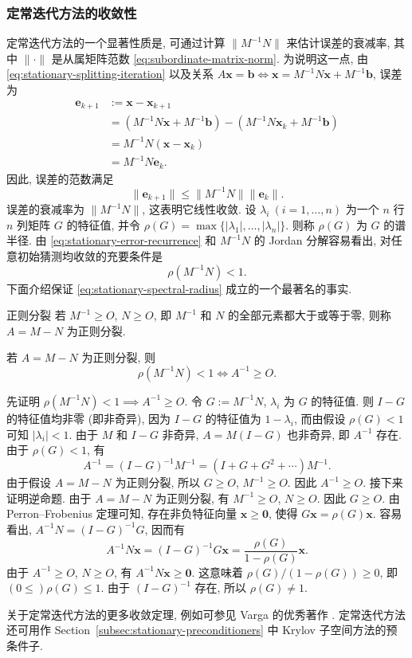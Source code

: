 \subsubsection{{定常迭代方法的收敛性}}\label{subsec:stationary-convergence}
{定常迭代方法的一个显著性质是, 可通过计算 $\|M^{-1}N\|$ 来估计误差的衰减率, 其中 $\|\cdot\|$ 是从属矩阵范数 \eqref{eq:subordinate-matrix-norm}. 为说明这一点, 由 \eqref{eq:stationary-splitting-iteration} 以及关系 $A\bm x=\bm b\iff\bm x=M^{-1}N\bm x+M^{-1}\bm b$, 误差为}
\begin{equation}\label{eq:stationary-error-recurrence}
\begin{aligned}
\bm e_{k+1}&:=\bm x-\bm x_{k+1}\\
&=(M^{-1}N\bm x+M^{-1}\bm b)-(M^{-1}N\bm x_k+M^{-1}\bm b)\\
&=M^{-1}N(\bm x-\bm x_k)\\
&=M^{-1}N\bm e_k.
\end{aligned}
\end{equation}
{因此, 误差的范数满足}
\[\|\bm e_{k+1}\|\le\|M^{-1}N\|\|\bm e_k\|.\]
{误差的衰减率为 $\|M^{-1}N\|$, 这表明它线性收敛.}
{设 $\lambda_i\ (i=1,\ldots,n)$ 为一个 $n$ 行 $n$ 列矩阵 $G$ 的特征值, 并令 $\rho(G)=\max\{|\lambda_1|,\ldots,|\lambda_n|\}$. 则称 $\rho(G)$ 为 $G$ 的谱半径. 由 \eqref{eq:stationary-error-recurrence} 和 $M^{-1}N$ 的 Jordan 分解容易看出, 对任意初始猜测均收敛的充要条件是}
\begin{equation}\label{eq:stationary-spectral-radius}\rho(M^{-1}N)<1.\end{equation}
{下面介绍保证 \eqref{eq:stationary-spectral-radius} 成立的一个最著名的事实.}
\begin{Definition}{{正则分裂}}\label{def:regular-splitting}
{若 $M^{-1}\ge O$, $N\ge O$, 即 $M^{-1}$ 和 $N$ 的全部元素都大于或等于零, 则称 $A=M-N$ 为正则分裂.}
\end{Definition}
\begin{Theorem}\label{thm:regular-splitting-convergence}
{若 $A=M-N$ 为正则分裂, 则}
\[\rho(M^{-1}N)<1\iff A^{-1}\ge O.\]
\end{Theorem}
\begin{Proof}
{先证明 $\rho(M^{-1}N)<1\implies A^{-1}\ge O$. 令 $G:=M^{-1}N$, $\lambda_i$ 为 $G$ 的特征值. 则 $I-G$ 的特征值均非零 (即非奇异), 因为 $I-G$ 的特征值为 $1-\lambda_i$, 而由假设 $\rho(G)<1$ 可知 $|\lambda_i|<1$. 由于 $M$ 和 $I-G$ 非奇异, $A=M(I-G)$ 也非奇异, 即 $A^{-1}$ 存在. 由于 $\rho(G)<1$, 有}
\[A^{-1}=(I-G)^{-1}M^{-1}=(I+G+G^2+\cdots)M^{-1}.\]
{由于假设 $A=M-N$ 为正则分裂, 所以 $G\ge O$, $M^{-1}\ge O$. 因此 $A^{-1}\ge O$.}
{接下来证明逆命题. 由于 $A=M-N$ 为正则分裂, 有 $M^{-1}\ge O$, $N\ge O$. 因此 $G\ge O$. 由 Perron--Frobenius 定理可知, 存在非负特征向量 $\bm x\ge\bm0$, 使得 $G\bm x=\rho(G)\bm x$. 容易看出, $A^{-1}N=(I-G)^{-1}G$, 因而有}
\[A^{-1}N\bm x=(I-G)^{-1}G\bm x=\frac{\rho(G)}{1-\rho(G)}\bm x.\]
{由于 $A^{-1}\ge O$, $N\ge O$, 有 $A^{-1}N\bm x\ge\bm0$. 这意味着 $\rho(G)/(1-\rho(G))\ge0$, 即 $(0\le)\rho(G)\le1$. 由于 $(I-G)^{-1}$ 存在, 所以 $\rho(G)\ne1$.}
\end{Proof}
{关于定常迭代方法的更多收敛定理, 例如可参见 Varga 的优秀著作 .}
{定常迭代方法还可用作 Section~\ref{subsec:stationary-preconditioners} 中 Krylov 子空间方法的预条件子.}
